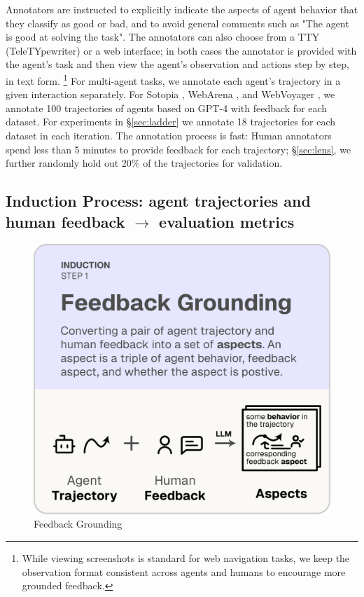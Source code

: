 Annotators are instructed to explicitly indicate the aspects of agent behavior that they classify as good or bad,
and to avoid general comments such as \textsf{"The agent is good at solving the task"}.
The annotators can also choose from a TTY (TeleTYpewriter) or a web interface; in both cases the annotator is provided with the agent's task
and then view the agent's observation and actions step by step, in text form. \footnote{While viewing screenshots is standard for web navigation tasks, we keep the observation format consistent across agents and humans to encourage more grounded feedback.}
For multi-agent tasks, we annotate each agent's trajectory in a given interaction separately. For Sotopia \citep{zhousotopia}, WebArena \citep{zhouwebarena},
and WebVoyager \citep{he2024webvoyager}, we annotate 100 trajectories of agents based on GPT-4 \citep{achiam2023gpt} with feedback for each dataset. For experiments in \S\ref{sec:ladder} we annotate 18 trajectories for each dataset in each
iteration. The annotation process is fast: Human annotators spend less than 5 minutes to provide feedback for each trajectory; \S\ref{sec:lens}, we further randomly hold out 20\% of the trajectories for validation.

\subsection{\texorpdfstring{Induction Process: agent trajectories and human feedback $\rightarrow$ evaluation metrics}{Induction Process: agent trajectories and human feedback -> evaluation metrics}}
\label{sec:induction_process}

\begin{figure}
  \vspace{-15pt}
  \includegraphics[width=\linewidth]{figs/autolibra_step_1.pdf}
  \vspace{-10pt}
  \caption{Feedback Grounding}
  \label{fig:feedback_grounding}
\end{figure}
